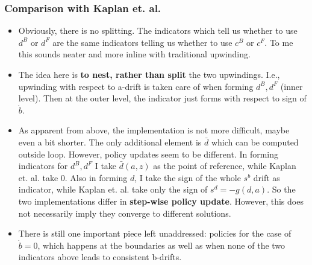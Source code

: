 \documentclass[11pt]{article}
\begin{document}
\subsubsection{Comparison with Kaplan et. al.}
\label{sec:org14444ff}
\begin{itemize}
\item Obviously, there is no splitting. The indicators which tell us whether to use \(d^B\) or \(d^F\) are the same indicators telling us whether to use \(c^B\) or \(c^F\). To me this sounds neater and more inline with traditional upwinding.
\item The idea here is \textbf{to nest, rather than split} the two upwindings. I.e., upwinding with respect to a-drift is taken care of when forming \(d^B, d^F\) (inner level). Then at the outer level, the indicator just forms with respect to sign of \(\dot{b}\).
\item As apparent from above, the implementation is not more difficult, maybe even a bit shorter. The only additional element is \(\bar{d}\) which can be computed outside loop. However, policy updates seem to be different. In forming indicators for \(d^B, d^F\) I take \(\bar{d}(a,z)\) as the point of reference, while Kaplan et. al. take 0. Also in forming \(d\), I take the sign of the whole \(s^b\) drift as indicator, while Kaplan et. al. take only the sign of \(s^d = -g(d,a)\). So the two implementations differ in \textbf{step-wise policy update}. However, this does not necessarily imply they converge to different solutions.
\item There is still one important piece left unaddressed: policies for the case of \(\dot{b} = 0\), which happens at the boundaries as well as when none of the two indicators above leads to consistent b-drifts.
\end{itemize}
\end{document}
